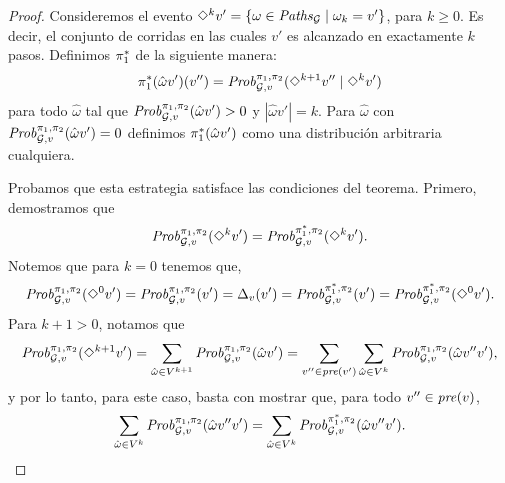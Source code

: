 \begin{proof}
  Consideremos el evento $\Diamond^{k} v' = \{ \omega \in
  \mathit{Paths}_{\mathcal{G}} \mid \omega_k = v'\}$, para $k\geq 0$. Es decir,
  el conjunto de corridas en las cuales $v'$ es alcanzado en exactamente $k$ pasos.
  Definimos $\pi^*_{1}$ de la siguiente manera:
  \[
  \pi^*_{1}(\hat{\omega}v')(v'') =  \mathit{Prob}^{\pi_{1}, \pi_{2}}_{\mathcal{G},v}(\Diamond^{k+1} v'' \mid \Diamond^k v') 
  \]
  para todo $\hat{\omega}$ tal que
  $\mathit{Prob}^{\pi_{1}, \pi_{2}}_{\mathcal{G},v}(\hat{\omega}v') > 0$ y
  $|\hat{\omega}v'| = k$.  Para $\hat{\omega}$ con
  $\mathit{Prob}^{\pi_{1}, \pi_{2}}_{\mathcal{G},v}(\hat{\omega}v') = 0$ definimos $\pi^*_{1}(\hat{\omega}v')$ como una distribución arbitraria cualquiera.

  Probamos que esta estrategia satisface las condiciones del teorema.
  Primero, demostramos que
  \begin{equation}\label{equ:diamondk}
    \mathit{Prob}^{\pi_{1}, \pi_{2}}_{\mathcal{G},v}(\Diamond^{k} v') =
    \mathit{Prob}^{\pi^*_{1}, \pi_{2}}_{\mathcal{G},v}(\Diamond^{k} v').
  \end{equation}
  Notemos que para $k=0$ tenemos que,
  \[\mathit{Prob}^{\pi_{1}, \pi_{2}}_{\mathcal{G},v}(\Diamond^{0} v') =
  \mathit{Prob}^{\pi_{1}, \pi_{2}}_{\mathcal{G},v}(v') = \Delta_v(v') =
  \mathit{Prob}^{\pi^*_{1}, \pi_{2}}_{\mathcal{G},v}(v')=
  \mathit{Prob}^{\pi^*_{1}, \pi_{2}}_{\mathcal{G},v}(\Diamond^{0} v').\]
  Para $k + 1 > 0$, notamos que
  \[
  \mathit{Prob}^{\pi_{1}, \pi_{2}}_{\mathcal{G},v}(\Diamond^{k+1} v') = \sum_{\hat{\omega} \in V^{k+1}} \mathit{Prob}^{\pi_{1}, \pi_{2}}_{\mathcal{G},v}(\hat{\omega}v')  = \sum_{v'' \in \mathit{pre}(v')}\sum_{\hat{\omega} \in V^k} \mathit{Prob}^{\pi_{1}, \pi_{2}}_{\mathcal{G},v}(\hat{\omega}v''v'),
  \] 
  y por lo tanto, para este caso, basta con mostrar que, para todo
  $v''\in\mathit{pre}(v)$,
  \[
    \sum_{\hat{\omega} \in V^k} \mathit{Prob}^{\pi_{1}, \pi_{2}}_{\mathcal{G},v}(\hat{\omega}v''v') = \sum_{\hat{\omega} \in V^k} \mathit{Prob}^{\pi^*_{1}, \pi_{2}}_{\mathcal{G},v}(\hat{\omega}v''v').
  \]


\end{proof}
